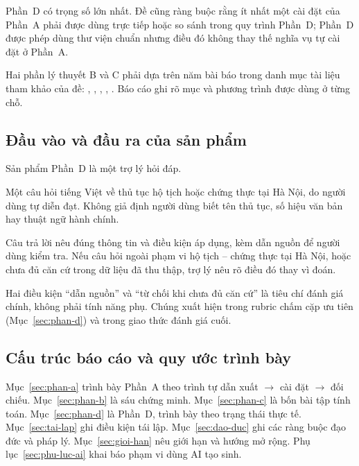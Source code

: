 Phần~D có trọng số lớn nhất. Đề cũng ràng buộc rằng ít nhất một cài đặt của
Phần~A phải được dùng trực tiếp hoặc so sánh trong quy trình Phần~D; Phần~D được
phép dùng thư viện chuẩn nhưng điều đó không thay thế nghĩa vụ tự cài đặt ở
Phần~A.

Hai phần lý thuyết B và C phải dựa trên năm bài báo trong danh mục tài liệu tham
khảo của đề: \cite{attention}, \cite{lora}, \cite{qlora}, \cite{rlhf},
\cite{dpo}. Báo cáo ghi rõ mục và phương trình được dùng ở từng chỗ.

\subsection{Đầu vào và đầu ra của sản phẩm}

Sản phẩm Phần~D là một trợ lý hỏi đáp.

\begin{description}[leftmargin=2em,style=nextline]
\item[Đầu vào] Một câu hỏi tiếng Việt về thủ tục hộ tịch hoặc chứng thực tại
Hà Nội, do người dùng tự diễn đạt. Không giả định người dùng biết tên thủ tục,
số hiệu văn bản hay thuật ngữ hành chính.
\item[Đầu ra mong muốn] Câu trả lời nêu đúng thông tin và điều kiện áp dụng, kèm
dẫn nguồn để người dùng kiểm tra. Nếu câu hỏi ngoài phạm vi hộ tịch -- chứng thực
tại Hà Nội, hoặc chưa đủ căn cứ trong dữ liệu đã thu thập, trợ lý nêu rõ điều đó
thay vì đoán.
\end{description}

Hai điều kiện ``dẫn nguồn'' và ``từ chối khi chưa đủ căn cứ'' là tiêu chí đánh giá
chính, không phải tính năng phụ. Chúng xuất hiện trong rubric chấm cặp ưu tiên
(Mục~\ref{sec:phan-d}) và trong giao thức đánh giá cuối.

\subsection{Cấu trúc báo cáo và quy ước trình bày}

Mục~\ref{sec:phan-a} trình bày Phần~A theo trình tự dẫn xuất $\to$ cài đặt $\to$
đối chiếu. Mục~\ref{sec:phan-b} là sáu chứng minh. Mục~\ref{sec:phan-c} là bốn
bài tập tính toán. Mục~\ref{sec:phan-d} là Phần~D, trình bày theo trạng thái thực
tế. Mục~\ref{sec:tai-lap} ghi điều kiện tái lập. Mục~\ref{sec:dao-duc} ghi các
ràng buộc đạo đức và pháp lý. Mục~\ref{sec:gioi-han} nêu giới hạn và hướng mở
rộng. Phụ lục~\ref{sec:phu-luc-ai} khai báo phạm vi dùng AI tạo sinh.

